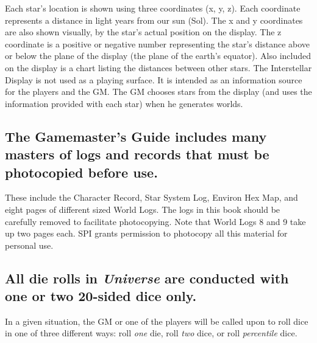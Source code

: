 Each star's location is shown using three coordinates (x, y, z).  Each
coordinate represents a distance in light years from our sun (Sol).
The x and y coordinates are also shown visually, by the star's actual
position on the display.  The z coordinate is a positive or negative
number representing the star's distance above or below the plane of
the display (the plane of the earth's equator).  Also included on the
display is a chart listing the distances between other stars.  The
Interstellar Display is not used as a playing surface.  It is intended
as an information source for the players and the GM.  The GM chooses
stars from the display (and uses the information provided with each
star) when he generates worlds.


\subsection[Photocopiable Masters]{The Gamemaster's Guide includes
  many masters of logs and records that must be photocopied before
  use.}
\label{sec:photocopy-masters}

These include the Character Record, Star System Log, Environ Hex Map,
and eight pages of different sized World Logs.  The logs in this book
should be carefully removed to facilitate photocopying.  Note that
World Logs 8 and 9 take up two pages each.  SPI grants permission to
photocopy all this material for personal use.


\subsection[Die Rolls]{All die rolls in  \emph{Universe} are conducted
  with one or two 
  20-sided dice only.}
\label{sec:die-rolls}

In a given situation, the GM or one of the players will be called upon
to roll dice in one of three different ways: roll \emph{one} die, roll
\emph{two} dice, or roll \emph{percentile} dice.

